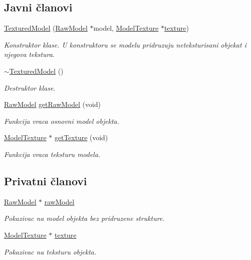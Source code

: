 \subsection*{Javni članovi}
\begin{DoxyCompactItemize}
\item 
\hyperlink{classmodel_1_1TexturedModel_affbb36dc66a365064576e186a975777a}{Textured\+Model} (\hyperlink{classmodel_1_1RawModel}{Raw\+Model} $\ast$model, \hyperlink{classtexture_1_1Texture}{Model\+Texture} $\ast$\hyperlink{classmodel_1_1TexturedModel_aad9aacee1ff02e44bd8ee9daff22f817}{texture})
\begin{DoxyCompactList}\small\item\em Konstruktor klase. U konstruktoru se modelu pridruzuju neteksturisani objekat i njegova tekstura. \end{DoxyCompactList}\item 
\hyperlink{classmodel_1_1TexturedModel_a8a11ba96d5a73a962a2ffcf8c5a53afe}{$\sim$\+Textured\+Model} ()
\begin{DoxyCompactList}\small\item\em Destruktor klase. \end{DoxyCompactList}\item 
\hyperlink{classmodel_1_1RawModel}{Raw\+Model} \hyperlink{classmodel_1_1TexturedModel_a8074adea6d7e368690a977b4ad571378}{get\+Raw\+Model} (void)
\begin{DoxyCompactList}\small\item\em Funkcija vraca osnovni model objekta. \end{DoxyCompactList}\item 
\hyperlink{classtexture_1_1Texture}{Model\+Texture} $\ast$ \hyperlink{classmodel_1_1TexturedModel_ad2bb5d174a506bd9d1f807e84aba4cdc}{get\+Texture} (void)
\begin{DoxyCompactList}\small\item\em Funkcija vraca teksturu modela. \end{DoxyCompactList}\end{DoxyCompactItemize}
\subsection*{Privatni članovi}
\begin{DoxyCompactItemize}
\item 
\hyperlink{classmodel_1_1RawModel}{Raw\+Model} $\ast$ \hyperlink{classmodel_1_1TexturedModel_ac6157368c7e55a78aa02f9546f5f2dc3}{raw\+Model}
\begin{DoxyCompactList}\small\item\em Pokazivac na model objekta bez pridruzene strukture. \end{DoxyCompactList}\item 
\hyperlink{classtexture_1_1Texture}{Model\+Texture} $\ast$ \hyperlink{classmodel_1_1TexturedModel_aad9aacee1ff02e44bd8ee9daff22f817}{texture}
\begin{DoxyCompactList}\small\item\em Pokazivac na teksturu objekta. \end{DoxyCompactList}\end{DoxyCompactItemize}


